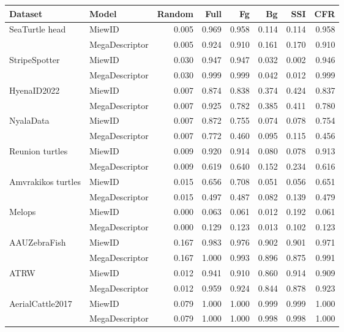 \begin{table}[!t]
\centering
\scriptsize
\setlength{\tabcolsep}{2.5pt}
\begin{tabular}[t]{@{}llrrrrrr@{}}
\toprule
\textbf{Dataset} & \textbf{Model} & \textbf{Random} & \textbf{Full} & \textbf{Fg} & \textbf{Bg} & \textbf{SSI} & \textbf{CFR} \\
\midrule
SeaTurtle head & MiewID & 0.005 & 0.969 & 0.958 & 0.114 & 0.114 & 0.958 \\
 & MegaDescriptor & 0.005 & 0.924 & 0.910 & 0.161 & 0.170 & 0.910 \\
\midrule
StripeSpotter & MiewID & 0.030 & 0.947 & 0.947 & 0.032 & 0.002 & 0.946 \\
 & MegaDescriptor & 0.030 & 0.999 & 0.999 & 0.042 & 0.012 & 0.999 \\
\midrule
HyenaID2022 & MiewID & 0.007 & 0.874 & 0.838 & 0.374 & 0.424 & 0.837 \\
 & MegaDescriptor & 0.007 & 0.925 & 0.782 & 0.385 & 0.411 & 0.780 \\
\midrule
NyalaData & MiewID & 0.007 & 0.872 & 0.755 & 0.074 & 0.078 & 0.754 \\
 & MegaDescriptor & 0.007 & 0.772 & 0.460 & 0.095 & 0.115 & 0.456 \\
\midrule
Reunion turtles & MiewID & 0.009 & 0.920 & 0.914 & 0.080 & 0.078 & 0.913 \\
 & MegaDescriptor & 0.009 & 0.619 & 0.640 & 0.152 & 0.234 & 0.616 \\
\midrule
Amvrakikos turtles & MiewID & 0.015 & 0.656 & 0.708 & 0.051 & 0.056 & 0.651 \\
 & MegaDescriptor & 0.015 & 0.497 & 0.487 & 0.082 & 0.139 & 0.479 \\
\midrule
Melops & MiewID & 0.000 & 0.063 & 0.061 & 0.012 & 0.192 & 0.061 \\
 & MegaDescriptor & 0.000 & 0.129 & 0.123 & 0.013 & 0.102 & 0.123 \\
\midrule
AAUZebraFish & MiewID & 0.167 & 0.983 & 0.976 & 0.902 & 0.901 & 0.971 \\
 & MegaDescriptor & 0.167 & 1.000 & 0.993 & 0.896 & 0.875 & 0.991 \\
\midrule
ATRW & MiewID & 0.012 & 0.941 & 0.910 & 0.860 & 0.914 & 0.909 \\
 & MegaDescriptor & 0.012 & 0.959 & 0.924 & 0.844 & 0.878 & 0.923 \\
\midrule
AerialCattle2017 & MiewID & 0.079 & 1.000 & 1.000 & 0.999 & 0.999 & 1.000 \\
 & MegaDescriptor & 0.079 & 1.000 & 1.000 & 0.998 & 0.998 & 1.000 \\

\end{tabular}
\end{table}
